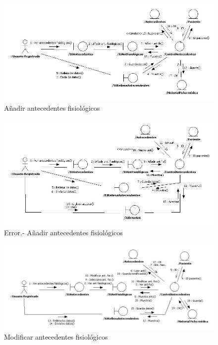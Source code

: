 \documentclass[a4paper,oneside,11pt]{book}
\begin{document}
			\bigskip
			\bigskip
			\begin{figure}[H]
			  \centering
			    \includegraphics[width=16cm]{img/jpg/colaboraciones/33_AnadirAntecedente.jpg}
			  \caption{Añadir antecedentes fisiológicos}
			  \label{fig:col_ant_fis_fm_anadir}
			\end{figure}
			
			\bigskip
			\bigskip
			\begin{figure}[H]
			  \centering
			    \includegraphics[width=16cm]{img/jpg/colaboraciones/34_AnadirAntecedenteError.jpg}
			  \caption{Error.- Añadir antecedentes fisiológicos}
			  \label{fig:col_ant_fis_fm_anadir_err}
			\end{figure}
			
			\begin{figure}[H]
			  \centering
			    \includegraphics[width=16cm]{img/jpg/colaboraciones/35_ModificarAntecedente.jpg}
			  \caption{Modificar antecedentes fisiológicos}
			  \label{fig:col_ant_fis_fm_modificar}
			\end{figure}
			
\end{document}
